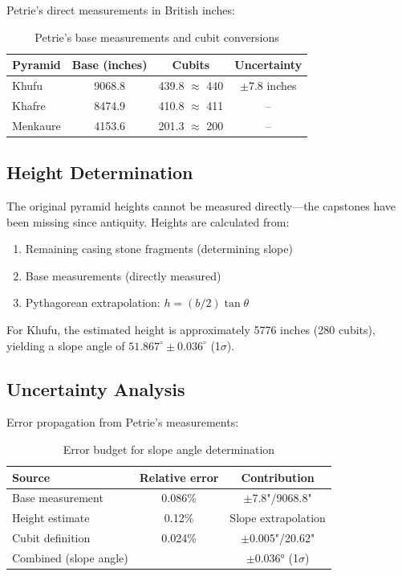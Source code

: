 \documentclass[11pt]{article}
\theoremstyle{definition}
\theoremstyle{remark}
\begin{document}
Petrie's direct measurements in British inches:

\begin{table}[h]
\centering
\begin{tabular}{@{}lccc@{}}
\toprule
Pyramid & Base (inches) & Cubits & Uncertainty \\
\midrule
Khufu & 9068.8 & 439.8 $\approx$ 440 & $\pm$7.8 inches \\
Khafre & 8474.9 & 410.8 $\approx$ 411 & -- \\
Menkaure & 4153.6 & 201.3 $\approx$ 200 & -- \\
\bottomrule
\end{tabular}
\caption{Petrie's base measurements and cubit conversions}
\end{table}

\subsection{Height Determination}

The original pyramid heights cannot be measured directly—the capstones have been missing since antiquity. Heights are calculated from:
\begin{enumerate}
\item Remaining casing stone fragments (determining slope)
\item Base measurements (directly measured)
\item Pythagorean extrapolation: $h = (b/2) \tan\theta$
\end{enumerate}

For Khufu, the estimated height is approximately 5776 inches (280 cubits), yielding a slope angle of $51.867^\circ \pm 0.036^\circ$ (1$\sigma$).

\subsection{Uncertainty Analysis}

Error propagation from Petrie's measurements:

\begin{table}[h]
\centering
\begin{tabular}{@{}lcc@{}}
\toprule
Source & Relative error & Contribution \\
\midrule
Base measurement & 0.086\% & $\pm$7.8"/9068.8" \\
Height estimate & 0.12\% & Slope extrapolation \\
Cubit definition & 0.024\% & $\pm$0.005"/20.62" \\
\midrule
Combined (slope angle) & & $\pm$0.036° (1$\sigma$) \\
\bottomrule
\end{tabular}
\caption{Error budget for slope angle determination}
\end{table}
\end{document}
